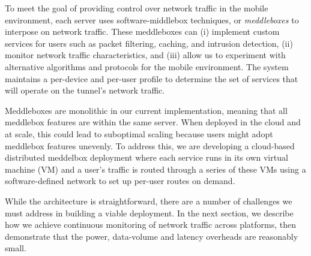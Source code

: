 To meet the goal of providing control over network traffic in the mobile 
environment, each \meddle
server uses software-middlebox techniques, or \emph{meddleboxes} to interpose on 
network traffic. These meddleboxes can (i) implement custom services for users such as packet
filtering, caching, and intrusion detection, (ii) monitor network
traffic characteristics, and (iii) allow us to experiment with alternative
algorithms and protocols for the mobile environment.
The system maintains a per-device and per-user profile 
to determine the set of services that will operate on the tunnel's 
network traffic. 

Meddleboxes are monolithic in our current implementation, meaning 
that all meddlebox features are within the same \meddle server. When deployed 
in the cloud and at scale, this could lead to suboptimal scaling because 
users might adopt meddlebox features unevenly. To address this, we are 
developing a cloud-based distributed meddelbox deployment where each service runs 
in its own virtual machine (VM) and a user's traffic is routed through a series of these VMs using a 
software-defined network to set up per-user routes on demand.

While the \meddle architecture is straightforward, there are a 
number of challenges we must address in building a viable deployment. 
In the next section, we describe how we achieve continuous monitoring 
of network traffic across platforms, then demonstrate that the power, data-volume and latency 
overheads are reasonably small.







%


